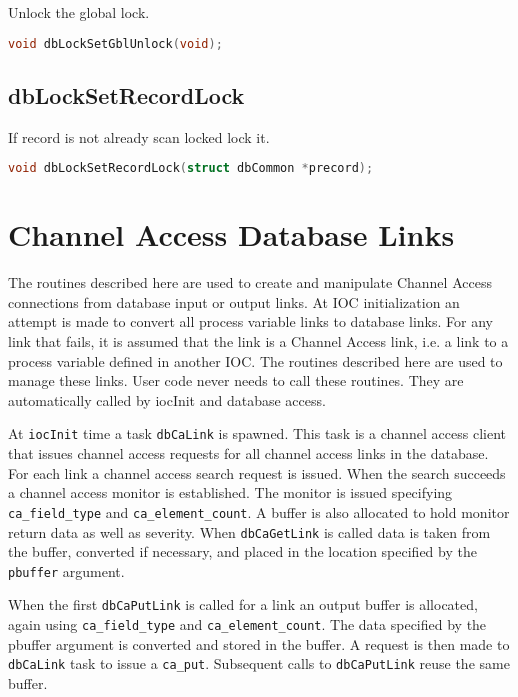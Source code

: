 Unlock the global lock.

\begin{lstlisting}[language=C]
void dbLockSetGblUnlock(void);
\end{lstlisting}

\subsection{dbLockSetRecordLock}

If record is not already scan locked lock it.

\begin{lstlisting}[language=C]
void dbLockSetRecordLock(struct dbCommon *precord);
\end{lstlisting}

\section{Channel Access Database Links}

The routines described here are used to create and manipulate Channel Access connections from database input or output links.
At IOC initialization an attempt is made to convert all process variable links to database links.
For any link that fails, it is assumed that the link is a Channel Access link, i.e. a link to a process variable defined in another IOC.
The routines described here are used to manage these links.
User code never needs to call these routines.
They are automatically called by iocInit and database access.

At \verb|iocInit| time a task \verb|dbCaLink| is spawned.
This task is a channel access client that issues channel access requests for all channel access links in the database.
For each link a channel access search request is issued.
When the search succeeds a channel access monitor is established.
The monitor is issued specifying \verb|ca_field_type| and \verb|ca_element_count|.
A buffer is also allocated to hold monitor return data as well as severity.
When \verb|dbCaGetLink| is called data is taken from the buffer, converted if necessary, and placed in the location specified by the \verb|pbuffer| 
argument.

When the first \verb|dbCaPutLink| is called for a link an output buffer is allocated, again using \verb|ca_field_type| and \verb|ca_element_count|.
The data specified by the pbuffer argument is converted and stored in the buffer.
A request is then made to \verb|dbCaLink| task to issue a \verb|ca_put|.
Subsequent calls to \verb|dbCaPutLink| reuse the same buffer.

